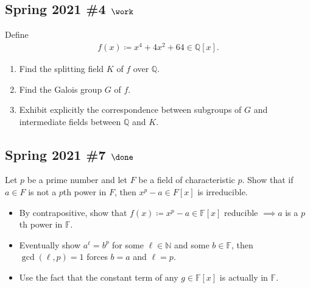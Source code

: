 \hypertarget{spring-2021-4-work}{%
\subsection{\texorpdfstring{Spring 2021 \#4
\(\work\)}{Spring 2021 \#4 \textbackslash work}}\label{spring-2021-4-work}}

Define
\begin{align*}
f(x) \coloneqq x^4 + 4x^2 + 64 \in {\mathbb{Q}}[x]
.\end{align*}

\begin{enumerate}
\def\labelenumi{\alph{enumi}.}
\item
  Find the splitting field \(K\) of \(f\) over \({\mathbb{Q}}\).
\item
  Find the Galois group \(G\) of \(f\).
\item
  Exhibit explicitly the correspondence between subgroups of \(G\) and
  intermediate fields between \({\mathbb{Q}}\) and \(K\).
\end{enumerate}

\hypertarget{spring-2021-7-done}{%
\subsection{\texorpdfstring{Spring 2021 \#7
\(\done\)}{Spring 2021 \#7 \textbackslash done}}\label{spring-2021-7-done}}

Let \(p\) be a prime number and let \(F\) be a field of characteristic
\(p\). Show that if \(a\in F\) is not a \(p\)th power in \(F\), then
\(x^p-a \in F[x]\) is irreducible.

\begin{strategy}

\envlist

\begin{itemize}
\tightlist
\item
  By contrapositive, show that
  \(f(x) \coloneqq x^p-a \in {\mathbb{F}}[x]\) reducible \(\implies a\)
  is a \(p\)th power in \({\mathbb{F}}\).
\item
  Eventually show \(a^\ell = b^p\) for some \(\ell\in {\mathbb{N}}\) and
  some \(b\in {\mathbb{F}}\), then \(\gcd(\ell, p) = 1\) forces \(b=a\)
  and \(\ell=p\).
\item
  Use the fact that the constant term of any \(g\in {\mathbb{F}}[x]\) is
  actually in \({\mathbb{F}}\).
\end{itemize}

\end{strategy}


